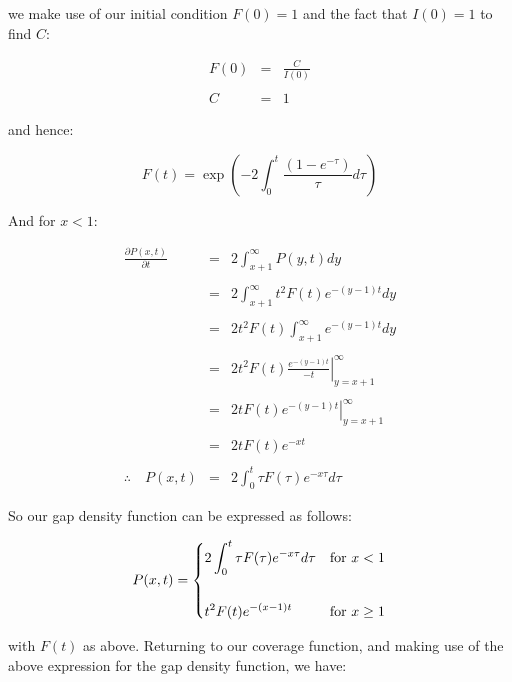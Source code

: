 we make use of our initial condition $F(0) = 1$ and the fact that $I(0) = 1$ to find $C$: \bigskip

\begin{eqnarray*}
	F(0) & = & \frac{C}{I(0)} \\\\
	   C & = & 1 
\end{eqnarray*}\medskip

and hence: \bigskip

\[
	F(t) = \exp \left( -2 \int_{0}^{t} \frac{(1 - e^{-\tau})}{\tau} d\tau \right)
\]\medskip

And for $x < 1$: \bigskip

\begin{eqnarray*}
	\frac{\partial P(x, t)}{\partial t} & = & 2 \int_{x + 1}^{\infty} P(y, t) dy \\\\
										& = & 2 \int_{x + 1}^{\infty} t^2 F(t) e^{-(y - 1)t} dy \\\\
										& = & 2 t^2 F(t) \int_{x + 1}^{\infty} e^{-(y - 1)t} dy \\\\
										& = & 2 t^2 F(t) \left. \frac{e^{-(y - 1)t}}{-t} \right|_{y = x + 1}^{\infty} \\\\
										& = & 2 t F(t) \left. e^{-(y - 1)t} \right|_{y = x + 1}^{\infty} \\\\
										& = & 2 t F(t) e^{-xt} \\\\
			   \therefore \quad P(x, t) & = & 2 \int_{0}^{t} \tau F(\tau) e^{-x\tau} d\tau 
\end{eqnarray*}\medskip

So our gap density function can be expressed as follows: \bigskip

\begin{eqnarray*}
	P(x, t) = 
	\begin{dcases}
		2 \int_{0}^{t} \tau F(\tau) e^{-x\tau} d\tau		& \text{for } x < 1 \\\\
		t^2 F(t) e^{-(x - 1)t}								& \text{for } x \geq 1
	\end{dcases}
\end{eqnarray*}\medskip

with $F(t)$ as above. Returning to our coverage function, and making use of the above expression 
for the gap density function, we have: \bigskip

